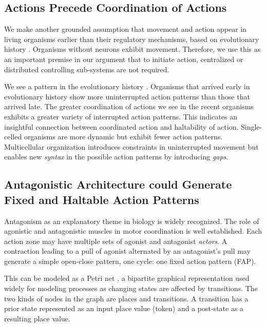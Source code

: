 \subsection{Actions Precede Coordination of Actions}

We make another grounded assumption that movement and action appear in living organisms earlier than their regulatory mechanisms, based on evolutionary history \cite{Levin2014}.  Organisms without neurons exhibit movement. Therefore, we use this as an important premise in our argument that to initiate action, centralized or distributed controlling sub-systems are not required.  

We see a pattern in the evolutionary history \cite{Levin2014}.  Organisms that arrived early in evolutionary history show more uninterrupted action patterns than those that arrived late. The greater coordination of actions we see in the recent organisms exhibits a greater variety of interrupted action patterns. This indicates an insightful connection between coordinated action and haltability of action. Single-celled organisms are more dynamic but exhibit fewer action patterns. Multicellular organization introduces constraints in uninterrupted movement but enables new \textit{syntax} in the possible action patterns by introducing \textit{gaps}.  

\subsection{Antagonistic Architecture could Generate Fixed and Haltable Action Patterns}
Antagonism as an explanatory theme in biology is widely recognized. The role of agonistic and antagonistic muscles in motor coordination is well established. Each action zone may have multiple sets of agonist and antagonist \textit{actors}.  A contraction leading to a pull of agonist alternated by an antagonist's pull may generate a simple open-close pattern, one cycle: one fixed action pattern (FAP). 

This can be modeled as a Petri net \cite{peterson1977petri}, a bipartite graphical representation used widely for modeling processes as changing states are affected by transitions. The two kinds of nodes in the graph are places and transitions. A transition has a prior state represented as an input place value (token) and a post-state as a resulting place value. 

